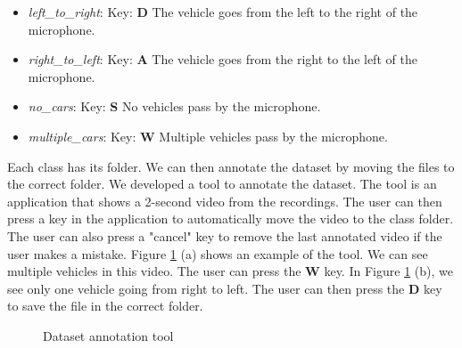 \begin{itemize}
    \item  \textit{left\_to\_right}: Key: \textbf{D} The vehicle goes from the left to the right of the microphone.
    \item  \textit{right\_to\_left}: Key: \textbf{A} The vehicle goes from the right to the left of the microphone.
    \item  \textit{no\_cars}: Key: \textbf{S} No vehicles pass by the microphone.
    \item  \textit{multiple\_cars}: Key: \textbf{W} Multiple vehicles pass by the microphone.
\end{itemize}

Each class has its folder. We can then annotate the dataset by moving the files to the correct folder. We developed a tool to annotate the dataset. The tool is an application that shows a 2-second video from the recordings. The user can then press a key in the application to automatically move the video to the class folder. The user can also press a "cancel" key to remove the last annotated video if the user makes a mistake. Figure \ref{fig:dataset_annotation_tool} (a) shows an example of the tool. We can see multiple vehicles in this video. The user can press the \textbf{W} key. In Figure \ref{fig:dataset_annotation_tool} (b), we see only one vehicle going from right to left. The user can then press the \textbf{D} key to save the file in the correct folder.

\begin{figure}[H]
    \centering
    \qquad
    \caption{Dataset annotation tool}
    \label{fig:dataset_annotation_tool}
\end{figure}


